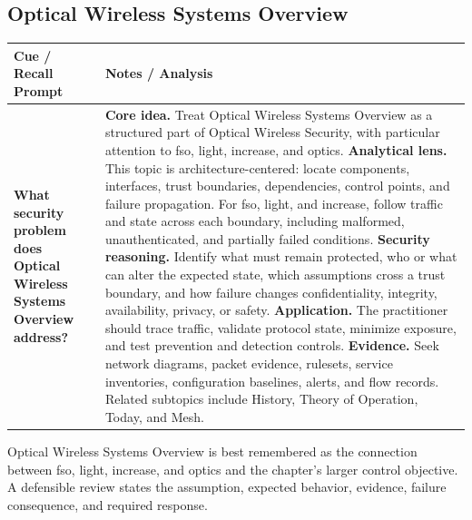 \documentclass[11pt]{article}
\newcommand{\CornellHeader}{%
\rowcolor{Navy}\color{white}\bfseries Cue / Recall Prompt & \color{white}\bfseries Notes / Analysis\\\hline}
\newcommand{\CornellRow}[2]{%
\cellcolor{CueGray}\RaggedRight\textbf{#1} & \RaggedRight #2\\\hline}
\begin{document}
\subsection*{Optical Wireless Systems Overview}
\begin{longtable}{>{\RaggedRight\arraybackslash}p{}|>{\RaggedRight\arraybackslash}p{}}
\CornellHeader
\CornellRow{What security problem does Optical Wireless Systems Overview address?}{\textbf{Core idea.} Treat Optical Wireless Systems Overview as a structured part of Optical Wireless Security, with particular attention to fso, light, increase, and optics. \textbf{Analytical lens.} This topic is architecture-centered: locate components, interfaces, trust boundaries, dependencies, control points, and failure propagation. For fso, light, and increase, follow traffic and state across each boundary, including malformed, unauthenticated, and partially failed conditions. \textbf{Security reasoning.} Identify what must remain protected, who or what can alter the expected state, which assumptions cross a trust boundary, and how failure changes confidentiality, integrity, availability, privacy, or safety. \textbf{Application.} The practitioner should trace traffic, validate protocol state, minimize exposure, and test prevention and detection controls. \textbf{Evidence.} Seek network diagrams, packet evidence, rulesets, service inventories, configuration baselines, alerts, and flow records. Related subtopics include History, Theory of Operation, Today, and Mesh.}
\end{longtable}
\begin{topicsummary}
Optical Wireless Systems Overview is best remembered as the connection between fso, light, increase, and optics and the chapter's larger control objective. A defensible review states the assumption, expected behavior, evidence, failure consequence, and required response.
\end{topicsummary}
\end{document}
